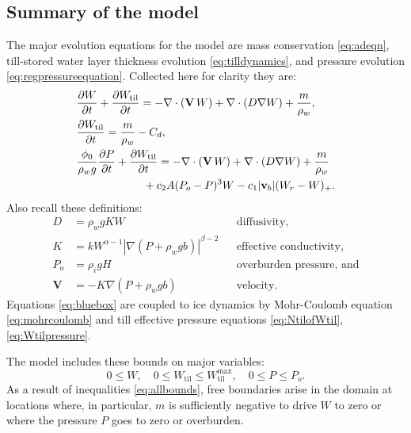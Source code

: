 \documentclass[gmd]{copernicus}   %
\newcommand{\text}{\textrm}
\newcommand\bv{\mathbf{v}}
\newcommand\bV{\mathbf{V}}
\newcommand{\ddt}[1]{\ensuremath{\frac{\partial #1}{\partial t}}}
\newcommand{\Div}{\nabla\cdot}
\newcommand{\grad}{\nabla}
\newcommand{\Wtil}{W_{\text{til}}}
\newcommand{\Wtilmax}{W_{\text{til}}^{\text{max}}}
\begin{document}
\subsection{Summary of the model}  The major evolution equations for the model are mass conservation \eqref{eq:adeqn}, till-stored water layer thickness evolution \eqref{eq:tilldynamics}, and pressure evolution \eqref{eq:regpressureequation}.  Collected here for clarity they are:
\begin{align}
&\ddt{W} + \ddt{\Wtil} = - \Div\left(\bV\, W\right) + \Div \left(D \grad W\right) + \frac{m}{\rho_w}, \label{eq:bluebox} \\
&\frac{\partial \Wtil}{\partial t} = \frac{m}{\rho_w} - C_d, \notag \\
&\frac{\phi_0}{\rho_w g} \ddt{P} + \ddt{\Wtil} = - \Div\left(\bV\, W\right) + \Div \left(D \grad W\right) + \frac{m}{\rho_w} \notag \\
& \qquad \qquad \qquad + c_2 A (P_o - P)^3 W - c_1 |\bv_b| (W_r - W)_+. \notag
\end{align}
Also recall these definitions:
\begin{align*}
D    &= \rho_w g K W && \text{diffusivity,} \\
K    &= k W^{\alpha-1} \left|\grad(P+\rho_w g b)\right|^{\beta-2} && \text{effective conductivity,} \\
P_o  &= \rho_i g H && \text{overburden pressure, and} \\
\bV  &= - K \grad\left(P + \rho_w g b\right) && \text{velocity}.
\end{align*}
Equations \eqref{eq:bluebox} are coupled to ice dynamics by Mohr-Coulomb equation \eqref{eq:mohrcoulomb} and till effective pressure equations \eqref{eq:NtilofWtil}, \eqref{eq:Wtilpressure}.

The model includes these bounds on major variables:
\begin{equation}
0\le W, \quad 0\le \Wtil \le \Wtilmax, \quad 0 \le P \le P_o.  \label{eq:allbounds}
\end{equation}
As a result of inequalities \eqref{eq:allbounds}, free boundaries arise in the domain at locations where, in particular, $m$ is sufficiently negative to drive $W$ to zero or where the pressure $P$ goes to zero or overburden.
\end{document}

